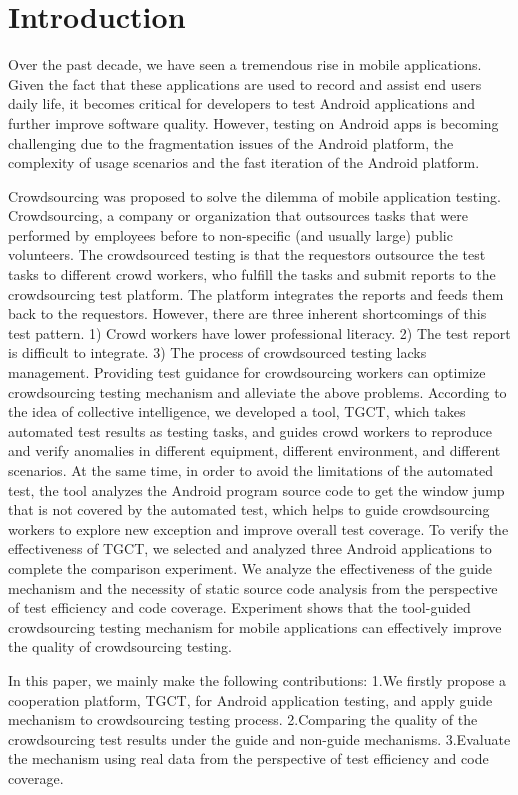 \section{Introduction}
Over the past decade, we have seen a tremendous rise in mobile applications. Given the fact that these applications are used to record and assist end users daily life, it becomes critical for developers to test Android applications and further improve software quality. However, testing on Android apps is becoming challenging due to the fragmentation issues of the Android platform\cite{han2012understanding,park2013fragmentation}, the complexity of usage scenarios and the fast iteration of the Android platform.

Crowdsourcing was proposed to solve the dilemma of mobile application testing. Crowdsourcing, a company or organization that outsources tasks that were performed by employees before to non-specific (and usually large) public volunteers\cite{brabham2008crowdsourcing,estelles2012towards}. The crowdsourced testing is that the requestors outsource the test tasks to different crowd workers, who fulfill the tasks and submit reports to the crowdsourcing test platform. The platform integrates the reports and feeds them back to the requestors\cite{feng2015test}. However, there are three inherent shortcomings of this test pattern. 1) Crowd workers have lower professional literacy. 2) The test report is difficult to integrate. 3) The process of crowdsourced testing lacks management. 
Providing test guidance for crowdsourcing workers can optimize crowdsourcing testing mechanism and alleviate the above problems. According to the idea of collective intelligence, we developed a tool, TGCT, which takes automated test results as testing tasks, and guides crowd workers to reproduce and verify anomalies in different equipment, different environment, and different scenarios. At the same time, in order to avoid the limitations of the automated test, the tool analyzes the Android program source code to get the window jump that is not covered by the automated test, which helps to guide crowdsourcing workers to explore new exception and improve overall test coverage. To verify the effectiveness of TGCT, we selected and analyzed three Android applications to complete the comparison experiment. We analyze the effectiveness of the guide mechanism and the necessity of static source code analysis from the perspective of test efficiency and code coverage. Experiment shows that the tool-guided crowdsourcing testing mechanism for mobile applications can effectively improve the quality of crowdsourcing testing.

In this paper, we mainly make the following contributions:
1.We firstly propose a cooperation platform, TGCT, for Android application testing, and apply guide mechanism to crowdsourcing testing process. 2.Comparing the quality of the crowdsourcing test results under the guide and non-guide mechanisms. 
3.Evaluate the mechanism using real data from the perspective of test efficiency and code coverage.


